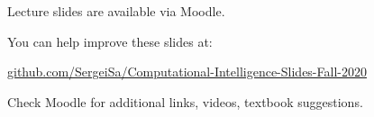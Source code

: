 \documentclass{beamer}
\begin{document}
\begin{frame}
\centerline{Lecture slides are available via Moodle.}
\bigskip
\centerline{You can help improve these slides at:}

\centerline{\href{https://github.com/SergeiSa/Computational-Intelligence-Slides-Fall-2020}{github.com/SergeiSa/Computational-Intelligence-Slides-Fall-2020}}


\bigskip
\centerline{Check Moodle for additional links, videos, textbook suggestions.}
\end{frame}
\end{document}
